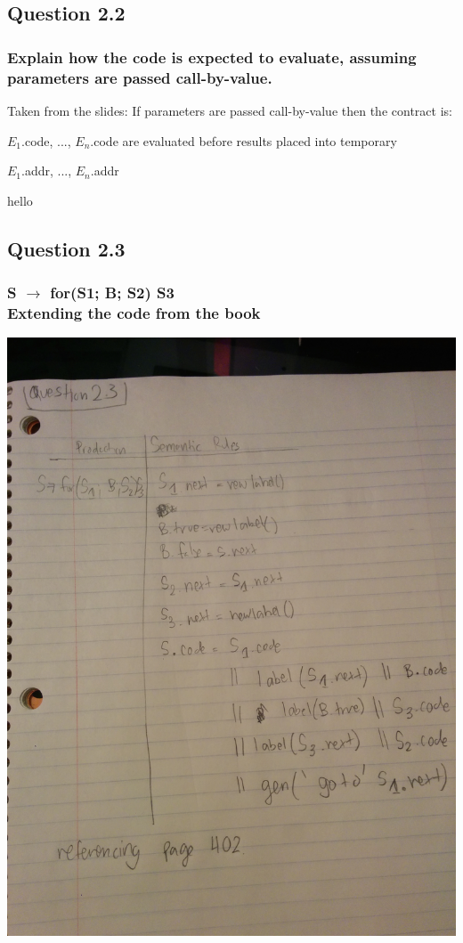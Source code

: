 \documentclass[11pt, oneside]{article}   	%
\begin{document}
\newpage

\subsection{Question 2.2}
\subsubsection{Explain how the code is expected to evaluate, assuming parameters are passed call-by-value.}
\par Taken from the slides: If parameters are passed call-by-value then the contract is: 
\par $E_1$.code, ..., $E_n$.code are evaluated before results placed into temporary 
\par $E_1$.addr, ..., $E_n$.addr
\par \noindent hello

\newpage

\subsection{Question 2.3}
\subsubsection{S $\rightarrow$ for(S1; B; S2) S3 \\ Extending the code from the book}
\includegraphics[scale=0.15]{IMG_20141029_014044.jpg}
\end{document}
